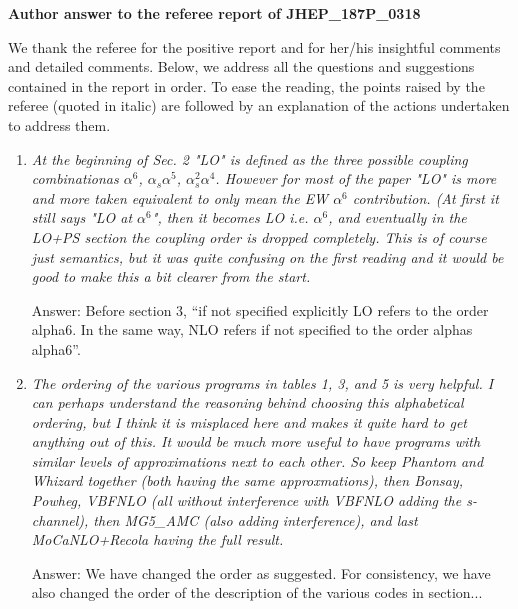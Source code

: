 \documentclass{report}
\begin{document}
\noindent

\begin{center}
  \LARGE \textbf{Author answer to the referee report of JHEP\_187P\_0318}
\end{center}
\vspace{0.5cm}
We thank the referee for the positive report and for her/his insightful comments and detailed comments. Below, we address all the questions and suggestions contained in the report in order. To ease the reading, the points raised by the referee (quoted in italic) are followed by an  explanation of the actions undertaken to address them. 

\vspace{0.5cm}
\begin{enumerate}

    \item \emph{ At the beginning of Sec. 2 "LO" is defined as the three possible coupling
combinationas $\alpha^6$, $\alpha_s \alpha^5$, $\alpha_s^2 \alpha^4$. However for most of the paper "LO" is more 
and more taken equivalent to only mean the EW $\alpha^6$ contribution. (At first it still says "LO at $\alpha^6$", 
then it becomes
LO i.e. $\alpha^6$, and eventually in the LO+PS section the coupling order is dropped completely. 
This is of course just semantics, but it was quite confusing on the first reading and it would be good to make this a bit clearer from the start.}

Answer: Before section 3, ``if not specified explicitly LO refers to the order alpha6.
In the same way, NLO refers if not specified to the order alphas alpha6''.

    \item \emph{The ordering of the various programs in tables 1, 3, and 5 is very helpful.
I can perhaps understand the reasoning behind choosing this alphabetical
ordering, but I think it is misplaced here and makes it quite hard to get
anything out of this. It would be much more useful to have programs with similar levels of approximations next to each other. So keep Phantom and Whizard together (both having the same approxmations), then Bonsay, Powheg, VBFNLO (all without interference with VBFNLO adding the s-channel), then MG5\_AMC (also adding interference), and last MoCaNLO+Recola having the full result.}

Answer: We have changed the order as suggested.
For consistency, we have also changed the order of the description of the various codes in section...


\end{enumerate}
\end{document}
